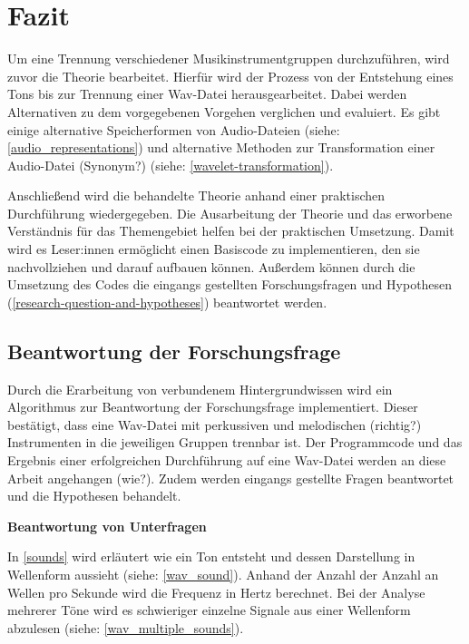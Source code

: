 \chapter{Fazit}
%

Um eine Trennung verschiedener Musikinstrumentgruppen durchzuführen, wird zuvor die Theorie bearbeitet.
Hierfür wird der Prozess von der Entstehung eines Tons bis zur Trennung einer Wav-Datei herausgearbeitet.
Dabei werden Alternativen zu dem vorgegebenen Vorgehen verglichen und evaluiert.
Es gibt einige alternative Speicherformen von Audio-Dateien (siehe: \cref{audio_representations}) und alternative Methoden zur Transformation einer Audio-Datei (Synonym?) (siehe: \cref{wavelet-transformation}).

\par

Anschließend wird die behandelte Theorie anhand einer praktischen Durchführung wiedergegeben.
Die Ausarbeitung der Theorie und das erworbene Verständnis für das Themengebiet helfen bei der praktischen Umsetzung.
Damit wird es Leser:innen ermöglicht einen Basiscode zu implementieren, den sie nachvollziehen und darauf aufbauen können.
Außerdem können durch die Umsetzung des Codes die eingangs gestellten Forschungsfragen und Hypothesen (\cref{research-question-and-hypotheses}) beantwortet werden.

%
\section{Beantwortung der Forschungsfrage}
%

Durch die Erarbeitung von verbundenem Hintergrundwissen wird ein Algorithmus zur Beantwortung der Forschungsfrage implementiert.
Dieser bestätigt, dass eine Wav-Datei mit perkussiven und melodischen (richtig?) Instrumenten in die jeweiligen Gruppen trennbar ist.
Der Programmcode und das Ergebnis einer erfolgreichen Durchführung auf eine Wav-Datei werden an diese Arbeit angehangen (wie?).
Zudem werden eingangs gestellte Fragen beantwortet und die Hypothesen behandelt.

%
\textbf{Beantwortung von Unterfragen}
%

In \cref{sounds} wird erläutert wie ein Ton entsteht und dessen Darstellung in Wellenform aussieht (siehe: \cref{wav_sound}).
Anhand der Anzahl der Anzahl an Wellen pro Sekunde wird die Frequenz in Hertz berechnet.
Bei der Analyse mehrerer Töne wird es schwieriger einzelne Signale aus einer Wellenform abzulesen (siehe: \cref{wav_multiple_sounds}).

